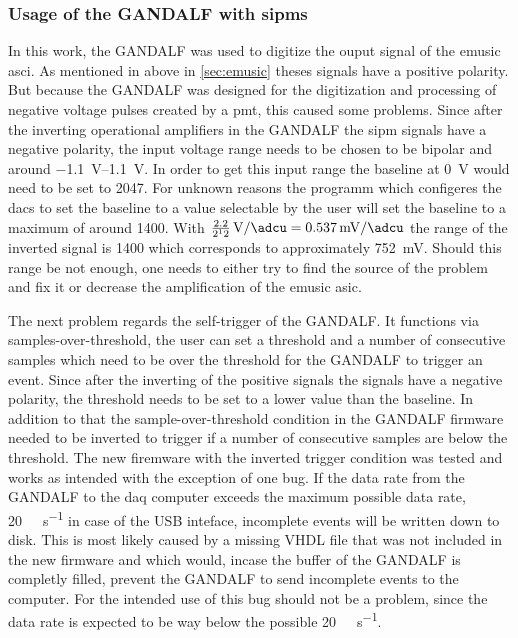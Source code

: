 \subsubsection{Usage of the GANDALF with \acp{sipm}}
In this work, the GANDALF was used to digitize the ouput signal of the \ac{emusic} \ac{asci}.
As mentioned in above in \autoref{sec:emusic} theses signals have a positive polarity.
But because the GANDALF was designed for the digitization and processing of negative voltage pulses created by a \ac{pmt}, this caused some problems.
Since after the inverting operational amplifiers in the GANDALF the \ac{sipm} signals have a negative polarity, the input voltage range needs to be chosen to be bipolar and around \SIrange{-1.1}{1.1}{\volt}.
In order to get this input range the baseline at \SI{0}{\volt} would need to be set to \SI{2047}{\adcu}.
For unknown reasons the programm which configeres the \acp{dac} to set the baseline to a \si{\adcu} value selectable by the user will set the baseline to a maximum of around \SI{1400}{\adcu}.
With $\frac{2.2}{2^12}\,\si{\volt\per\adcu} = \SI{0.537}{\milli\volt\per\adcu}$ the range of the inverted signal is \SI{1400}{\adcu} which corresponds to approximately \SI{752}{\milli\volt}.
Should this range be not enough, one needs to either try to find the source of the problem and fix it or decrease the amplification of the \ac{emusic} \ac{asic}.

The next problem regards the self-trigger of the GANDALF.
It functions via samples-over-threshold, the user can set a threshold and a number of consecutive samples which need to be over the threshold for the GANDALF to trigger an event.
Since after the inverting of the positive signals the signals have a negative polarity, the threshold needs to be set to a lower \si{\adcu} value than the baseline.
In addition to that the sample-over-threshold condition in the GANDALF firmware needed to be inverted to trigger if a number of consecutive samples are below the threshold.
The new firemware with the inverted trigger condition was tested and works as intended with the exception of one bug.
If the data rate from the GANDALF to the \ac{daq} computer exceeds the maximum possible data rate, \SI{20}{\mega\byte\per\second} in case of the USB inteface, incomplete events will be written down to disk.
This is most likely caused by a missing VHDL file that was not included in the new firmware and which would, incase the buffer of the GANDALF is completly filled, prevent the GANDALF to send incomplete events to the computer.
For the intended use of this bug should not be a problem, since the data rate is expected to be way below the possible \SI{20}{\mega\byte\per\second}.
